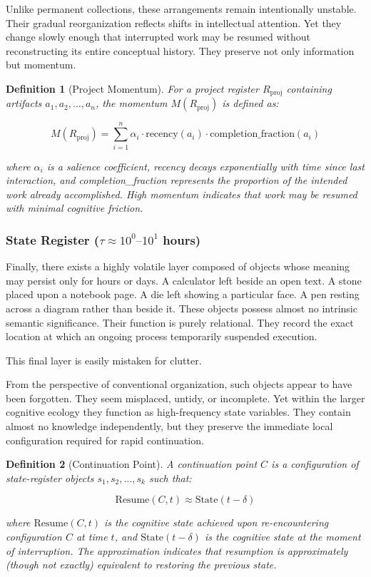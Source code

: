 \documentclass[12pt,oneside]{article}
\newtheorem{definition}{Definition}[section]
\theoremstyle{remark}
\begin{document}
Unlike permanent collections, these arrangements remain intentionally unstable. Their gradual reorganization reflects shifts in intellectual attention. Yet they change slowly enough that interrupted work may be resumed without reconstructing its entire conceptual history. They preserve not only information but momentum.

\begin{definition}[Project Momentum]
For a project register $R_{\text{proj}}$ containing artifacts $a_1, a_2, \ldots, a_n$, the momentum $M(R_{\text{proj}})$ is defined as:

\begin{equation}
M(R_{\text{proj}}) = \sum_{i=1}^n \alpha_i \cdot \text{recency}(a_i) \cdot \text{completion\_fraction}(a_i)
\end{equation}

where $\alpha_i$ is a salience coefficient, recency decays exponentially with time since last interaction, and completion\_fraction represents the proportion of the intended work already accomplished. High momentum indicates that work may be resumed with minimal cognitive friction.
\end{definition}

\subsubsection{State Register ($\tau \approx 10^0\text{--}10^1$ hours)}

Finally, there exists a highly volatile layer composed of objects whose meaning may persist only for hours or days. A calculator left beside an open text. A stone placed upon a notebook page. A die left showing a particular face. A pen resting across a diagram rather than beside it. These objects possess almost no intrinsic semantic significance. Their function is purely relational. They record the exact location at which an ongoing process temporarily suspended execution.

This final layer is easily mistaken for clutter.

From the perspective of conventional organization, such objects appear to have been forgotten. They seem misplaced, untidy, or incomplete. Yet within the larger cognitive ecology they function as high-frequency state variables. They contain almost no knowledge independently, but they preserve the immediate local configuration required for rapid continuation.

\begin{definition}[Continuation Point]
A continuation point $C$ is a configuration of state-register objects $s_1, s_2, \ldots, s_k$ such that:

\begin{equation}
\text{Resume}(C, t) \approx \text{State}(t - \delta)
\end{equation}

where $\text{Resume}(C, t)$ is the cognitive state achieved upon re-encountering configuration $C$ at time $t$, and $\text{State}(t - \delta)$ is the cognitive state at the moment of interruption. The approximation indicates that resumption is approximately (though not exactly) equivalent to restoring the previous state.
\end{definition}
\end{document}
